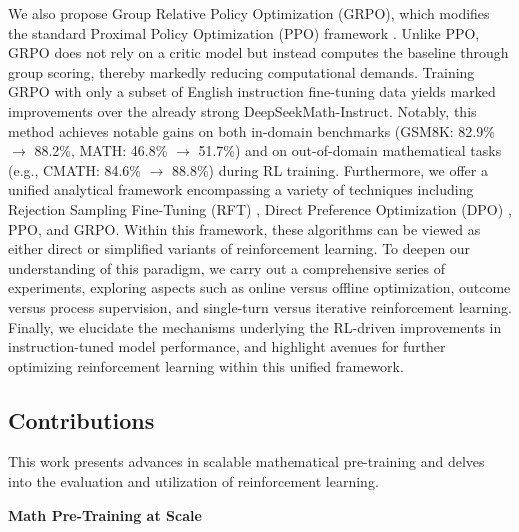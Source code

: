 We also propose Group Relative Policy Optimization (GRPO), which modifies the standard Proximal Policy Optimization (PPO) framework \citep{schulman2017proximal}. Unlike PPO, GRPO does not rely on a critic model but instead computes the baseline through group scoring, thereby markedly reducing computational demands. Training GRPO with only a subset of English instruction fine-tuning data yields marked improvements over the already strong DeepSeekMath-Instruct. Notably, this method achieves notable gains on both in-domain benchmarks (GSM8K: 82.9\% $\rightarrow$ 88.2\%, MATH: 46.8\% $\rightarrow$ 51.7\%) and on out-of-domain mathematical tasks (e.g., CMATH: 84.6\% $\rightarrow$ 88.8\%) during RL training. Furthermore, we offer a unified analytical framework encompassing a variety of techniques including Rejection Sampling Fine-Tuning (RFT) \citep{yuan2023scaling}, Direct Preference Optimization (DPO) \citep{dpo}, PPO, and GRPO. Within this framework, these algorithms can be viewed as either direct or simplified variants of reinforcement learning. To deepen our understanding of this paradigm, we carry out a comprehensive series of experiments, exploring aspects such as online versus offline optimization, outcome versus process supervision, and single-turn versus iterative reinforcement learning. Finally, we elucidate the mechanisms underlying the RL-driven improvements in instruction-tuned model performance, and highlight avenues for further optimizing reinforcement learning within this unified framework.

\subsection{Contributions}
This work presents advances in scalable mathematical pre-training and delves into the evaluation and utilization of reinforcement learning.

\textbf{Math Pre-Training at Scale}

